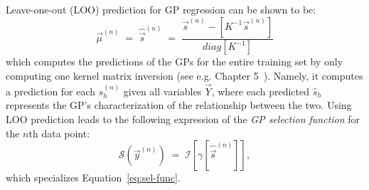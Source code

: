 Leave-one-out (LOO) prediction for GP regression can be shown to be:
%
\vspace{-.1cm}  %
\begin{equation}\label{eq:gp-loo}
\vec{\mu}^{(n)} \;=\;  \hat{\vec{s}}^{(n)} \;=\;  \frac{ \vec{s}^{(n)} -[ K^{-1} \vec{s}^{(n)} ] }{ diag [ K^{-1} ] }
\end{equation}
%
which computes the predictions of the GPs for the entire training set by only computing one kernel matrix inversion
(see e.g. Chapter 5~\citep{RasmussenGPbook}).
Namely, it computes a prediction for each $s_h^{(n)}$ given all variables $\vec{Y}$, where each predicted $\hat{s}_h$
represents the GP's characterization of the relationship between the two.
%
%
Using LOO prediction leads to the following expression of the \textit{GP selection function} for the
$n$th data point:
%
\vspace{-.1cm}      %
\begin{equation}\label{eq:gp-sel-func}
\mathcal{S}(\vec{y}^{(n)}) \;=\; \mathcal{I} \left[ \gamma \left[ \hat{\vec{s}}^{(n)} \right] \right],
\end{equation}
%
which specializes Equation~\eqref{eq:sel-func}.

